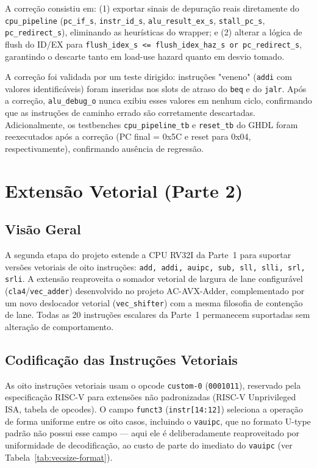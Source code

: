\documentclass[12pt, a4paper]{article}
\newcommand{\code}[1]{\texttt{#1}}
\begin{document}
A correção consistiu em: (1) exportar sinais de depuração reais
diretamente do \code{cpu\_pipeline} (\code{pc\_if\_s}, \code{instr\_id\_s},
\code{alu\_result\_ex\_s}, \code{stall\_pc\_s}, \code{pc\_redirect\_s}), eliminando
as heurísticas do wrapper; e (2) alterar a lógica de flush do ID/EX para 
\code{flush\_idex\_s <= flush\_idex\_haz\_s or pc\_redirect\_s}, garantindo o
descarte tanto em load-use hazard quanto em desvio tomado.

A correção foi validada por um teste dirigido: instruções
"veneno" (\code{addi} com valores identificáveis) foram inseridas nos
slots de atraso do \code{beq} e do \code{jalr}.
Após a correção,
\code{alu\_debug\_o} nunca exibiu esses valores em nenhum ciclo, confirmando
que as instruções de caminho errado são corretamente descartadas.
Adicionalmente, os testbenches \code{cpu\_pipeline\_tb} e \code{reset\_tb} do
GHDL foram reexecutados após a correção (PC final = 0x5C e reset para
0x04, respectivamente), confirmando ausência de regressão.

\section{Extensão Vetorial (Parte 2)}

\subsection{Visão Geral}

A segunda etapa do projeto estende a CPU RV32I da Parte~1 para suportar
versões vetoriais de oito instruções: \code{add, addi, auipc, sub, sll,
slli, srl, srli}. A extensão reaproveita o somador vetorial de largura de
lane configurável (\code{cla4}/\code{vec\_adder}) desenvolvido no projeto
AC-AVX-Adder, complementado por um novo deslocador vetorial
(\code{vec\_shifter}) com a mesma filosofia de contenção de lane. Todas
as 20 instruções escalares da Parte~1 permanecem suportadas sem
alteração de comportamento.

\subsection{Codificação das Instruções Vetoriais}

As oito instruções vetoriais usam o opcode \code{custom-0}
(\code{0001011}), reservado pela especificação RISC-V para extensões não
padronizadas (RISC-V Unprivileged ISA, tabela de opcodes). O campo
\code{funct3} (\code{instr[14:12]}) seleciona a operação de forma
uniforme entre os oito casos, incluindo o \code{vauipc}, que no formato
U-type padrão não possui esse campo --- aqui ele é deliberadamente
reaproveitado por uniformidade de decodificação, ao custo de parte do
imediato do \code{vauipc} (ver Tabela~\ref{tab:vecsize-format}).
\end{document}
